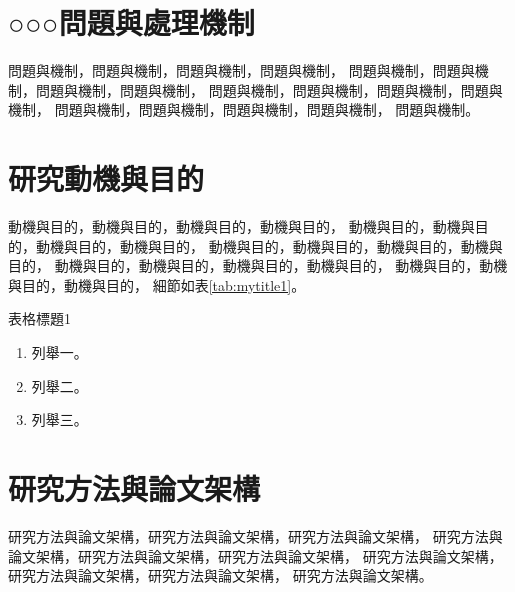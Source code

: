 \section{○○○問題與處理機制}
    問題與機制，問題與機制，問題與機制，問題與機制，
    問題與機制，問題與機制，問題與機制，問題與機制，
    問題與機制，問題與機制，問題與機制，問題與機制，
    問題與機制，問題與機制，問題與機制，問題與機制，
    問題與機制。

\section{研究動機與目的}
    動機與目的，動機與目的，動機與目的，動機與目的，
    動機與目的，動機與目的，動機與目的，動機與目的，
    動機與目的，動機與目的，動機與目的，動機與目的，
    動機與目的，動機與目的，動機與目的，動機與目的，
    動機與目的，動機與目的，動機與目的，
    細節如表\ref{tab:mytitle1}。
    \begin{table}[!t]
        \centering
        \caption{表格標題1}
        \label{tab:mytitle1}
        
    \end{table}

    \begin{enumerate}
        \item
        列舉一。
        \item
        列舉二。
        \item
        列舉三。
    \end{enumerate}

\section {研究方法與論文架構}
    研究方法與論文架構，研究方法與論文架構，研究方法與論文架構，
    研究方法與論文架構，研究方法與論文架構，研究方法與論文架構，
    研究方法與論文架構，研究方法與論文架構，研究方法與論文架構，
    研究方法與論文架構。

